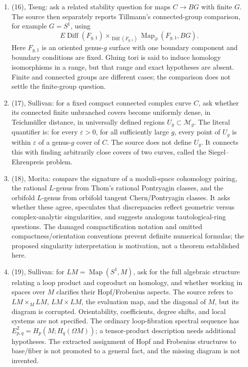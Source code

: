 \documentclass[11pt]{article}
\begin{document}
\begin{enumerate}
\item (16), Tseng: ask a related stability question for maps \(C\to BG\) with finite \(G\). The source then separately reports Tillmann's connected-group comparison, for example \(G=S^1\), using
\[
E\operatorname{Diff}(F_{g,1})\times_{\operatorname{Diff}(F_{g,1})}
\operatorname{Map}_{\partial}(F_{g,1},BG).
\]
Here \(F_{g,1}\) is an oriented genus-\(g\) surface with one boundary component and boundary conditions are fixed. Gluing tori is said to induce homology isomorphisms in a range, but that range and exact hypotheses are absent. Finite and connected groups are different cases; the comparison does not settle the finite-group question.
\item (17), Sullivan: for a fixed compact connected complex curve \(C\), ask whether its connected finite unbranched covers become uniformly dense, in Teichmüller distance, in universally defined regions \(U_g\subset\mathcal M_g\). The literal quantifier is: for every \(\varepsilon>0\), for all sufficiently large \(g\), every point of \(U_g\) is within \(\varepsilon\) of a genus-\(g\) cover of \(C\). The source does not define \(U_g\). It connects this with finding arbitrarily close covers of two curves, called the Siegel--Ehrenpreis problem.
\item (18), Morita: compare the signature of a moduli-space cohomology pairing, the rational \(L\)-genus from Thom's rational Pontryagin classes, and the orbifold \(L\)-genus from orbifold tangent Chern/Pontryagin classes. It asks whether these agree, speculates that discrepancies reflect geometric versus complex-analytic singularities, and suggests analogous tautological-ring questions. The damaged compactification notation and omitted compactness/orientation conventions prevent definite numerical formulas; the proposed singularity interpretation is motivation, not a theorem established here.
\item (19), Sullivan: for \(LM=\operatorname{Map}(S^1,M)\), ask for the full algebraic structure relating a loop product and coproduct on homology, and whether working in spaces over \(M\) clarifies their Hopf/Frobenius aspects. The source refers to \(LM\times_M LM\), \(LM\times LM\), the evaluation map, and the diagonal of \(M\), but its diagram is corrupted. Orientability, coefficients, degree shifts, and local systems are not specified. The ordinary loop-fibration spectral sequence has \(E^2_{p,q}=H_p(M;H_q(\Omega M))\); a tensor-product description needs additional hypotheses. The extracted assignment of Hopf and Frobenius structures to base/fiber is not promoted to a general fact, and the missing diagram is not invented.
\end{enumerate}
\end{document}
